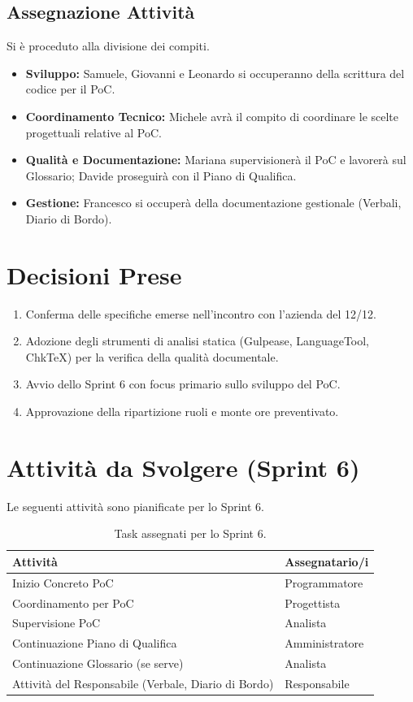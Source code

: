 \documentclass[a4paper, 11pt, oneside]{scrartcl}
\begin{document}
\subsection{Assegnazione Attività}
Si è proceduto alla divisione dei compiti.
\begin{itemize}
    \item \textbf{Sviluppo:} Samuele, Giovanni e Leonardo si occuperanno della scrittura del codice per il PoC.
    \item \textbf{Coordinamento Tecnico:} Michele avrà il compito di coordinare le scelte progettuali relative al PoC.
    \item \textbf{Qualità e Documentazione:} Mariana supervisionerà il PoC e lavorerà sul Glossario; Davide proseguirà con il Piano di Qualifica.
    \item \textbf{Gestione:} Francesco si occuperà della documentazione gestionale (Verbali, Diario di Bordo).
\end{itemize}


\section{Decisioni Prese}
\begin{enumerate}
    \item Conferma delle specifiche emerse nell'incontro con l'azienda del 12/12.
    \item Adozione degli strumenti di analisi statica (Gulpease, LanguageTool, ChkTeX) per la verifica della qualità documentale.
    \item Avvio dello Sprint 6 con focus primario sullo sviluppo del PoC.
    \item Approvazione della ripartizione ruoli e monte ore preventivato.
\end{enumerate}


\newpage
\section{Attività da Svolgere (Sprint 6)}
Le seguenti attività sono pianificate per lo Sprint 6.
\begin{table}[h!]
\centering
\begin{tabular}{@{}p{10cm}l@{}}
\toprule
\textbf{Attività} & \textbf{Assegnatario/i} \\
\midrule
Inizio Concreto PoC & Programmatore \\
Coordinamento per PoC & Progettista \\
Supervisione PoC & Analista \\
Continuazione Piano di Qualifica & Amministratore \\
Continuazione Glossario (se serve) & Analista\\
Attività del Responsabile (Verbale, Diario di Bordo) & Responsabile \\
\bottomrule
\end{tabular}
\caption{Task assegnati per lo Sprint 6.}
\end{table}
\end{document}
